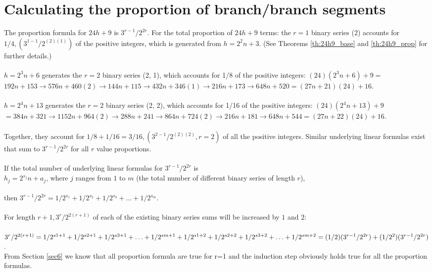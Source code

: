 \documentclass[sn-mathphys-num, pdflatex]{sn-jnl}
\begin{document}
\section{Calculating the proportion of branch/branch segments}\label{app3}
The proportion formula for $24h+9$ is $3^{r-1}/2^{2r}$. For the total proportion of $24h+9$ terms: the $r=1$ binary series (2) accounts for $1/4, (3^{1-1}/2^{(2)(1)})$ of the positive integers, which is generated from $h=2^2n+3$. (See Theorems \ref{th:24h9_base} and \ref{th:24h9_prop} for further details.) \\ \\
$h=2^3n+6$ generates the $r=2$ binary series (2, 1), which accounts for 1/8 of the positive integers: $(24)(2^3n+6)+9 =$ $192n+153\to 576n+460(2)\to 144n+115\to 432n+346(1)\to 216n+173\to 648n+520 = (27n+21)(24)+16$.\\ \\
$h=2^4n+13$ generates the $r=2$ binary series (2, 2), which accounts for 1/16 of the positive integers: $(24)(2^4n+13)+9$ $= 384n+321\to 1152n+964(2)\to 288n+241\to 864n+724(2)\to 216n+181\to 648n+544 = (27n+22)(24)+16.$ \\ \\
Together, they account for $1/8 + 1/16 = 3/16, (3^{2-1}/2^{(2)(2)}, r=2)$ of all the positive integers. Similar underlying linear formulas exist that sum to $3^{r-1}/2^{2r}$ for all $r$ value proportions.\\ \\ If the total number of underlying linear formulas for $3^{r-1}/2^{2r}$ is \\ $h_j = 2^{s_j}n+a_j$, where $j$ ranges from $1$ to $m$ (the total number of different binary series of length $r$),\\ \\ then $3^{r-1}/2^{2r} = 1/2^{s_1}+ 1/2^{s_2}+1/2^{s_3}+\ldots+1/2^{s_m}$. \\ \\
For length $r+1, 3^r/2^{2(r+1)}$ of each of the existing binary series sums will be increased by $1$ and $2$: \\ \\
$3^r/2^{2(r+1)} = 1/2^{s1+1}+ 1/2^{s2+1}+1/2^{s3+1}+\ldots+1/2^{sm+1}+ \\ 1/2^{s1+2}+ 1/2^{s2+2}+1/2^{s3+2}+\ldots+1/2^{sm+2} = 
(1/2)(3^{r-1}/2^{2r})+(1/2^2)(3^{r-1}/2^{2r})$. \\ 

\noindent From Section \ref{sec6} we know that all proportion formula are true for r=1 and the induction step obviously holds true for all the proportion formulas. \\ 
\end{document}
